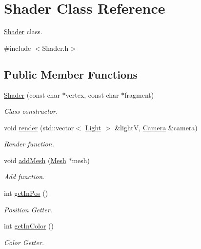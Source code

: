 \hypertarget{class_shader}{}\section{Shader Class Reference}
\label{class_shader}


\hyperlink{class_shader}{Shader} class.  




{\ttfamily \#include $<$Shader.\+h$>$}

\subsection*{Public Member Functions}
\begin{DoxyCompactItemize}
\item 
\hyperlink{class_shader_a7e02f1eaec796a7fc02c3191ce9fa5d4}{Shader} (const char $\ast$vertex, const char $\ast$fragment)
\begin{DoxyCompactList}\small\item\em Class constructor. \end{DoxyCompactList}\item 
void \hyperlink{class_shader_a86da40ddee3a9d49d11a6d9ebd533e4d}{render} (std\+::vector$<$ \hyperlink{class_light}{Light} $>$ \&lightV, \hyperlink{class_camera}{Camera} \&camera)
\begin{DoxyCompactList}\small\item\em Render function. \end{DoxyCompactList}\item 
void \hyperlink{class_shader_ab6af37727a2f0a0e5f31fb05e9137853}{add\+Mesh} (\hyperlink{class_mesh}{Mesh} $\ast$mesh)
\begin{DoxyCompactList}\small\item\em Add function. \end{DoxyCompactList}\item 
int \hyperlink{class_shader_ad52dea081c158e54bd3dcd5168623a3f}{get\+In\+Pos} ()
\begin{DoxyCompactList}\small\item\em Position Getter. \end{DoxyCompactList}\item 
int \hyperlink{class_shader_ae39ec6d01ef565e170cce67c75d3fa3d}{get\+In\+Color} ()
\begin{DoxyCompactList}\small\item\em Color Getter. \end{DoxyCompactList}\item 

\end{DoxyCompactItemize}
